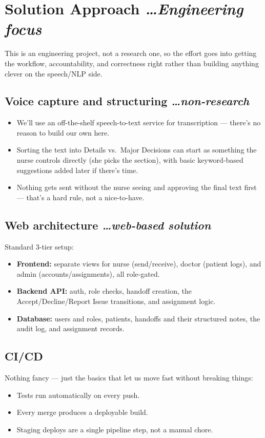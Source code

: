 \documentclass[11pt,a4paper]{article}
\newcommand{\BvrHint}[1]{%
  {\normalfont\normalsize\itshape\hfill #1}}
\begin{document}
\section{Solution Approach %
\BvrHint{\ldots Engineering focus}}
This is an engineering project, not a research one, so the
effort goes into getting the workflow, accountability, and
correctness right rather than building anything clever on the
speech/NLP side.

\subsection{Voice capture and structuring %
\BvrHint{\ldots non-research}}
\begin{itemize}[leftmargin=0.7cm]
    \item We'll use an off-the-shelf speech-to-text service for transcription --- there's no reason to build our own here.
    \item Sorting the text into Details vs.\ Major Decisions can start as something the nurse controls directly (she picks the section), with basic keyword-based suggestions added later if there's time.
    \item Nothing gets sent without the nurse seeing and approving the final text first --- that's a hard rule, not a nice-to-have.
\end{itemize}

\subsection{Web architecture %
\BvrHint{\ldots web-based solution}}
Standard 3-tier setup:
\begin{itemize}[leftmargin=0.7cm]
    \item \textbf{Frontend:} separate views for nurse (send/receive), doctor (patient logs), and admin (accounts/assignments), all role-gated.
    \item \textbf{Backend API:} auth, role checks, handoff creation, the Accept/Decline/Report Issue transitions, and assignment logic.
    \item \textbf{Database:} users and roles, patients, handoffs and their structured notes, the audit log, and assignment records.
\end{itemize}

\subsection{CI/CD}
Nothing fancy --- just the basics that let us move fast without breaking things:
\begin{itemize}[leftmargin=0.7cm]
    \item Tests run automatically on every push.
    \item Every merge produces a deployable build.
    \item Staging deploys are a single pipeline step, not a manual chore.
\end{itemize}
\end{document}
